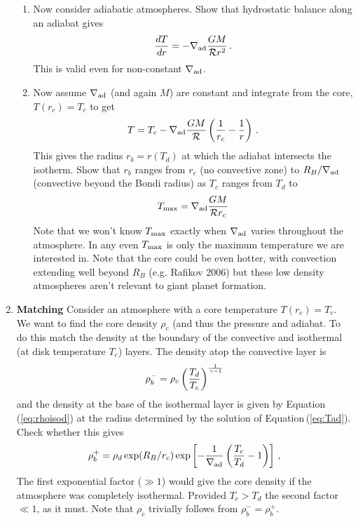 \documentclass[11pt]{article}
\newcommand{\delad}{{\nabla_{\rm ad}}}
\newcommand{\Rg}{\mathcal{R}}
\newcommand{\Eq}[1]{Equation\,(\ref{#1})}
\begin{document}
\begin{enumerate}
\begin{enumerate}
\item Now consider adiabatic atmospheres.  Show that hydrostatic balance along an adiabat gives
\begin{equation}
{dT \over dr} = - \delad{G M \over  \Rg r^2}\, .
\end{equation} 
This is valid even for non-constant $\delad$.  
\item Now assume $\delad$ (and again $M$) are constant and integrate from the core, $T(r_c) = T_c$ to get
\begin{equation}\label{eq:Tad}
T = T_c - \delad{G M \over  \Rg} \left({1 \over r_c} - {1 \over r}\right) \, .
\end{equation} 
This gives the radius $r_b = r(T_d)$ at which the adiabat intersects the isotherm.  Show that $r_b$ ranges from $r_c$ (no convective zone) to $R_B/\delad$ (convective beyond the Bondi radius) as $T_c$ ranges from $T_d$ to
\begin{equation}
T_{\rm max} = \delad {G M \over  \Rg r_c}
\end{equation} 
Note that we won't know $T_{\rm max}$ exactly when $\delad$ varies throughout the atmosphere.  In any even $T_{\rm max}$ is only the maximum temperature we are interested in.  Note that the core could be even hotter,  with convection extending well beyond $R_B$ (e.g. Rafikov 2006) but these low density atmospheres aren't relevant to giant planet formation.

\end{enumerate}
\item {\bf Matching} Consider an atmosphere with a core temperature $T(r_c) = T_c$.  We want to find the core density $\rho_c$ (and thus the pressure and adiabat.  To do this match the density at the boundary of the convective and isothermal (at disk temperature $T_c$) layers.  The density atop the convective layer is
\begin{equation}
\rho_b^- = \rho_c\left(T_d \over T_c\right)^{1 \over \gamma - 1}
\end{equation} 
and the density at the base of the isothermal layer is given by \Eq{eq:rhoisod} at the radius determined by the solution of \Eq{eq:Tad}.  Check whether this gives
\begin{equation}
\rho_b^+ = \rho_d\exp(R_B/r_c) \exp\left[ - {1 \over \delad} \left( {T_c \over T_d} - 1\right)\right] \, ,
\end{equation} 
The first exponential factor ($\gg 1$) would give the core density if the atmosphere was completely isothermal.  Provided $T_c > T_d$ the second factor $\ll 1$, as it must.  Note that $\rho_c$ trivially follows from $\rho_b^- = \rho_b^+$. 
\end{enumerate}
\end{document}
